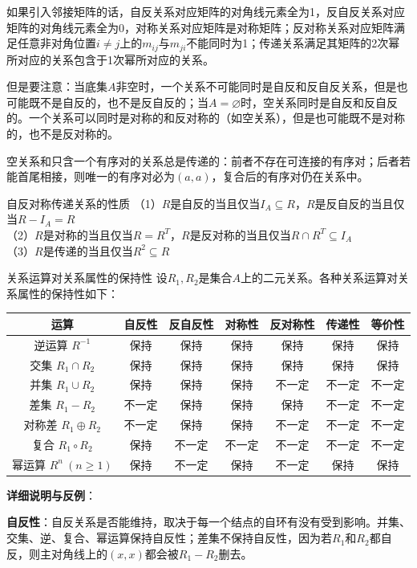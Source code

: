 \documentclass[lang=cn,11pt]{elegantbook}
\begin{document}
如果引入邻接矩阵的话，自反关系对应矩阵的对角线元素全为1，反自反关系对应矩阵的对角线元素全为0，对称关系对应矩阵是对称矩阵；反对称关系对应矩阵满足任意非对角位置$i\ne j$上的$m_{ij}$与$m_{ji}$不能同时为1；传递关系满足其矩阵的2次幂所对应的关系包含于1次幂所对应的关系。

但是要注意：当底集$A$非空时，一个关系不可能同时是自反和反自反关系，但是也可能既不是自反的，也不是反自反的；当$A=\varnothing$时，空关系同时是自反和反自反的。一个关系可以同时是对称的和反对称的（如空关系），但是也可能既不是对称的，也不是反对称的。

空关系和只含一个有序对的关系总是传递的：前者不存在可连接的有序对；后者若能首尾相接，则唯一的有序对必为$(a,a)$，复合后的有序对仍在关系中。
\begin{theorem}{自反对称传递关系的性质}
（1）$R$是自反的当且仅当$I_A\subseteq R$，$R$是反自反的当且仅当$R-I_A=R$\\
（2）$R$是对称的当且仅当$R=R^T$，$R$是反对称的当且仅当$R\cap R^T\subseteq I_A$\\
（3）$R$是传递的当且仅当$R^2\subseteq R$
\end{theorem}
\begin{theorem}{关系运算对关系属性的保持性}
设$R_1, R_2$是集合$A$上的二元关系。各种关系运算对关系属性的保持性如下：
\begin{center}
\begin{tabular}{|c|c|c|c|c|c|c|}
\hline
运算 & 自反性 & 反自反性 & 对称性 & 反对称性 & 传递性 & 等价性 \\
\hline
逆运算 $R^{-1}$ & 保持 & 保持 & 保持 & 保持 & 保持 & 保持 \\
\hline
交集 $R_1 \cap R_2$ & 保持 & 保持 & 保持 & 保持 & 保持 & 保持 \\
\hline
并集 $R_1 \cup R_2$ & 保持 & 保持 & 保持 & 不一定 & 不一定 & 不一定 \\
\hline
差集 $R_1 - R_2$ & 不一定 & 保持 & 保持 & 保持 & 不一定 & 不一定 \\
\hline
对称差 $R_1 \oplus R_2$ & 不一定 & 保持 & 保持 & 不一定 & 不一定 & 不一定 \\
\hline
复合 $R_1 \circ R_2$ & 保持 & 不一定 & 不一定 & 不一定 & 不一定 & 不一定 \\
\hline
幂运算 $R^n~(n\geqslant1)$ & 保持 & 不一定 & 保持 & 不一定 & 保持 & 保持 \\
\hline
\end{tabular}
\end{center}
\end{theorem}
\textbf{详细说明与反例}：

\textbf{自反性}：自反关系是否能维持，取决于每一个结点的自环有没有受到影响。并集、交集、逆、复合、幂运算保持自反性；差集不保持自反性，因为若$R_1$和$R_2$都自反，则主对角线上的$(x,x)$都会被$R_1-R_2$删去。
\end{document}
